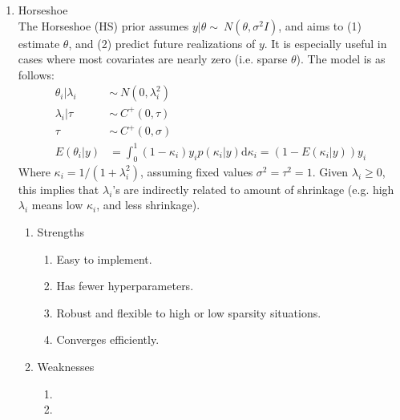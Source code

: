 \documentclass[11pt,letterpaper]{article}
\begin{document}
\begin{enumerate}
      \item Horseshoe \\
      The Horseshoe (HS) prior assumes $y|\theta \sim\ N(\theta,\sigma^2 I)$, and aims to
      (1) estimate $\theta$, and (2) predict future realizations of $y$. It is especially
      useful in cases where most covariates are nearly zero (i.e. sparse $\theta$). The
      model is as follows:
      \begin{align*}
      \theta_i|\lambda_i &\sim\ N(0,\lambda_i^2)\\
      \lambda_i|\tau &\sim\ C^+(0,\tau)\\
      \tau &\sim\ C^+(0,\sigma)\\
      E(\theta_i|y) &= \int_{0}^{1} (1-\kappa_i)y_ip(\kappa_i|y)\text{d}\kappa_i = (1-E
      (\kappa_i|y)) y_i
      \end{align*}
      Where $\kappa_i = 1/(1+\lambda_i^2)$, assuming fixed values $\sigma^2=\tau^2=1$. Given
      $\lambda_i \geq 0$, this implies that $\lambda_i$'s are indirectly related to amount
      of shrinkage (e.g. high $\lambda_i$ means low $\kappa_i$, and less shrinkage).
      \begin{enumerate}
        \item Strengths
              \begin{enumerate}
                \item Easy to implement.
                \item Has fewer hyperparameters.
                \item Robust and flexible to high or low sparsity situations.
                \item Converges efficiently.
              \end{enumerate}
        \item Weaknesses
              \begin{enumerate}
                \item 
                \item 
              \end{enumerate}
      \end{enumerate}
  \end{enumerate}
\end{document}
